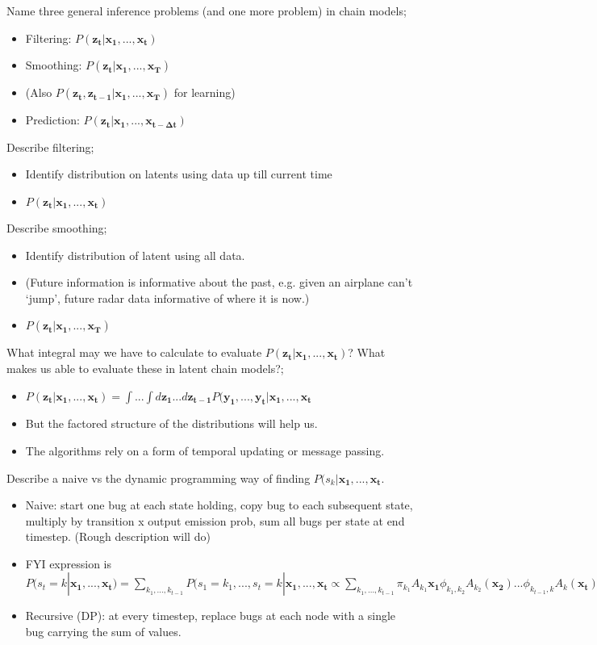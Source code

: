 \documentclass{article}
\begin{document}
Name three general inference problems (and one more problem) in chain models; \begin{itemize} \item Filtering: $P(\mathbf{z_t|x_1,...,x_t})$ \item Smoothing: $P(\mathbf{z_t|x_1,...,x_T})$  \item (Also $P(\mathbf{z_t, z_{t-1}|x_1,...,x_T})$ for learning) \item Prediction: $P(\mathbf{z_t|x_1,...,x_{t-\Delta t}})$ \end{itemize}

Describe filtering; \begin{itemize} \item Identify distribution on latents using data up till current time \item  $P(\mathbf{z_t|x_1,...,x_t})$ \end{itemize}

Describe smoothing; \begin{itemize} \item Identify distribution of latent using all data. \item (Future information is informative about the past, e.g. given an airplane can't `jump', future radar data informative of where it is now.) \item $P(\mathbf{z_t|x_1,...,x_T})$ \end{itemize}

What integral may we have to calculate to evaluate $P(\mathbf{z_t|x_1,...,x_t})$? What makes us able to evaluate these in latent chain models?; \begin{itemize} \item $P(\mathbf{z_t|x_1,...,x_t}) = \int ...\int d\mathbf{z_1}...d\mathbf{z_{t-1}}P(\mathbf{y_1},...,\mathbf{y_t}|\mathbf{x_1},...,\mathbf{x_t}$ \item But the factored structure of the distributions will help us. \item The algorithms rely on a form of temporal updating or message passing. \end{itemize}

Describe a naive vs the dynamic programming way of finding $P(s_k|\mathbf{x_1,...,x_t}$. \begin{itemize} \item Naive: start one bug at each state holding, copy bug to each subsequent state, multiply by transition x output emission prob, sum all bugs per state at end timestep. (Rough description will do) \item FYI expression is $P(s_t=k|\mathbf{x_1,...,x_t})=\sum_{k_1, ..., k_{t-1}}P(s_1=k_1,...,s_t=k|\mathbf{x_1,...,x_t}\propto\sum_{k_1,...,k_{t-1}}\pi_{k_1}A_{k_1}\mathbf{x_1}\phi_{k_1,k_2}A_{k_2}(\mathbf{x_2})...\phi_{k_{t-1},k}A_k(\mathbf{x_t})$ \item Recursive (DP): at every timestep, replace bugs at each node with a single bug carrying the sum of values. \end{itemize}
\end{document}
